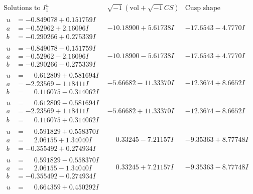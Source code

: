 \documentclass[1p]{elsarticle_modified}
\theoremstyle{definition}
\newcommand{\I}{\sqrt{-1}}
\begin{document}
$$\begin{array}{c|c|c}  
\text{Solutions to }I^u_{1}& \I (\text{vol} + \sqrt{-1}CS) & \text{Cusp shape}\\
 \hline 
\begin{aligned}
u &= -0.849078 + 0.151759 I \\
a &= -0.52962 + 2.16096 I \\
b &= -0.290266 + 0.275339 I\end{aligned}
 & -10.18900 + 5.61738 I & -17.6543 - 4.7770 I \\ \hline\begin{aligned}
u &= -0.849078 - 0.151759 I \\
a &= -0.52962 - 2.16096 I \\
b &= -0.290266 - 0.275339 I\end{aligned}
 & -10.18900 - 5.61738 I & -17.6543 + 4.7770 I \\ \hline\begin{aligned}
u &= \phantom{-}0.612809 + 0.581694 I \\
a &= -2.23569 - 1.18411 I \\
b &= \phantom{-}0.116075 - 0.314062 I\end{aligned}
 & -5.66682 - 11.33370 I & -12.3674 + 8.6652 I \\ \hline\begin{aligned}
u &= \phantom{-}0.612809 - 0.581694 I \\
a &= -2.23569 + 1.18411 I \\
b &= \phantom{-}0.116075 + 0.314062 I\end{aligned}
 & -5.66682 + 11.33370 I & -12.3674 - 8.6652 I \\ \hline\begin{aligned}
u &= \phantom{-}0.591829 + 0.558370 I \\
a &= \phantom{-}2.06155 + 1.34040 I \\
b &= -0.355492 + 0.274934 I\end{aligned}
 & \phantom{-}0.33245 - 7.21157 I & -9.35363 + 8.77748 I \\ \hline\begin{aligned}
u &= \phantom{-}0.591829 - 0.558370 I \\
a &= \phantom{-}2.06155 - 1.34040 I \\
b &= -0.355492 - 0.274934 I\end{aligned}
 & \phantom{-}0.33245 + 7.21157 I & -9.35363 - 8.77748 I \\ \hline\begin{aligned}
u &= \phantom{-}0.664359 + 0.450292 I \\

\end{aligned}
\end{array}$$
\end{document}
